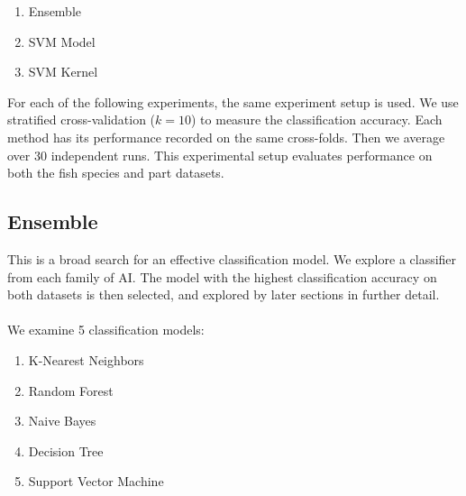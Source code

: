 \documentclass[runningheads]{llncs}
\begin{document}
\begin{enumerate}
  \item Ensemble
  \item SVM Model
  \item SVM Kernel
\end{enumerate}

For each of the following experiments, the same experiment setup is used.
We use stratified cross-validation ($k=10$) to measure the classification accuracy.
Each method has its performance recorded on the same cross-folds.
Then we average over 30 independent runs.
This experimental setup evaluates performance on both the fish species and part datasets.

\subsection{Ensemble}

This is a broad search for an effective classification model.
We explore a classifier from each family of AI.
The model with the highest classification accuracy on both datasets is then selected, and explored by later sections in further detail.
\\\\
We examine 5 classification models:

\begin{enumerate}
  \item K-Nearest Neighbors \cite{fix1989discriminatory}
  \item Random Forest \cite{ho1995random}
  \item Naive Bayes \cite{hand2001idiot}
  \item Decision Tree \cite{loh2011classification}
  \item Support Vector Machine \cite{cortes1995support}
\end{enumerate}
\end{document}
